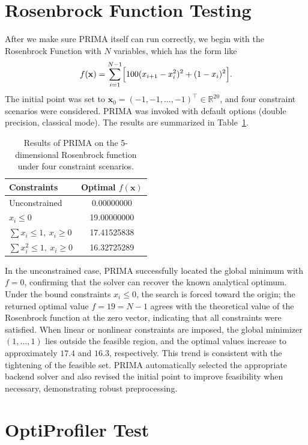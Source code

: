 \documentclass[12pt,a4paper]{article}  %
\theoremstyle{definition}
\numberwithin{equation}{section}
\begin{document}
\section{Rosenbrock Function Testing}
After we make sure PRIMA itself can run correctly, we begin with the Rosenbrock Function with $N$ variables, which has the form like\[
f(\mathbf{x}) = \sum_{i=1}^{N-1} \Bigl[ 100 (x_{i+1} - x_{i}^2)^2 + (1 - x_{i})^2 \Bigr].
\]The initial point was set to $\mathbf{x}_0 = (-1, -1, \dots, -1)^\top \in \mathbb{R}^{20}$,
and four constraint scenarios were considered. PRIMA was invoked with default options (double precision, classical mode). The results are summarized in Table~\ref{tab:rosenbrock}.
\begin{table}[H]
    \centering
    \caption{Results of PRIMA on the 5-dimensional Rosenbrock function under four constraint scenarios.}
    \label{tab:rosenbrock}
    \begin{tabular}{lc}
        \toprule
        \textbf{Constraints} & \textbf{Optimal \(f(\mathbf{x})\)} \\
        \midrule
        Unconstrained         & 0.00000000 \\
        \(x_i \leqslant 0\)         & 19.00000000 \\
        \(\sum x_i \leqslant 1,\ x_i \geqslant 0\) & 17.41525838 \\
        \(\sum x_i^2 \leqslant 1,\ x_i \geqslant 0\) & 16.32725289 \\
        \bottomrule
    \end{tabular}
\end{table}
In the unconstrained case, PRIMA successfully located the global
minimum with $f = 0$, confirming that the solver can recover
the known analytical optimum.  Under the bound constraints $x_i \le 0$,
the search is forced toward the origin; the returned optimal value
$f = 19 = N-1$ agrees with the theoretical value of the Rosenbrock
function at the zero vector, indicating that all constraints were
satisfied.  When linear or nonlinear constraints are imposed, the
global minimizer $(1,\dots,1)$ lies outside the feasible region, and
the optimal values increase to approximately $17.4$ and $16.3$,
respectively.  This trend is consistent with the tightening of the
feasible set.  PRIMA automatically selected the appropriate backend
solver and also revised the initial point to improve
feasibility when necessary, demonstrating robust preprocessing.
\section{OptiProfiler Test}
\end{document}
